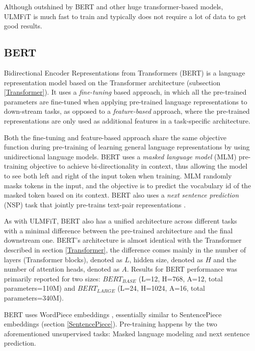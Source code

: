 Although outshined by BERT and other huge transformer-based models, ULMFiT is much fast to train and typically does not require a lot of data to get good results.



\subsection{BERT} \label{BERT}
Bidirectional Encoder Representations from Transformers (BERT) is a language representation model based on the Transformer \cite{vaswani2017} architecture (subsection \ref{Transformer}).
It uses a \textit{fine-tuning} based approach, in which all the pre-trained parameters are fine-tuned when applying pre-trained language representations to down-stream tasks, as opposed to a \textit{feature-based} approach, where the pre-trained representations are only used as additional features in a task-specific architecture.

Both the fine-tuning and feature-based approach share the same objective function during pre-training of learning general language representations by using unidirectional language models.
BERT uses a \textit{masked language model} (MLM) pre-training objective to achieve bi-directionality in context, thus allowing the model to see both left and right of the input token when training.
MLM randomly masks tokens in the input, and the objective is to predict the vocabulary id of the masked token based on its context.
BERT also uses a \textit{next sentence prediction} (NSP) task that jointly pre-trains text-pair representations \cite{devlin2019}.

As with ULMFiT, BERT also has a unified architecture across different tasks with a minimal difference between the pre-trained architecture and the final downstream one.
BERT's architecture is almost identical with the Transformer described in section \ref{Transformer}, the difference comes mainly in the number of layers (Transformer blocks), denoted as $L$, hidden size, denoted as $H$ and the number of attention heads, denoted as $A$.
Results for BERT performance was primarily reported for two sizes: $BERT_{BASE}$ (L=12, H=768, A=12, total parameters=110M) and $BERT_{LARGE}$ (L=24, H=1024, A=16, total parameters=340M).

BERT uses WordPiece embeddings \cite{wu2016}, essentially similar to SentencePiece embeddings (section \ref{SentencePiece}).
Pre-training happens by the two aforementioned unsupervised tasks: Masked language modeling and next sentence prediction.

